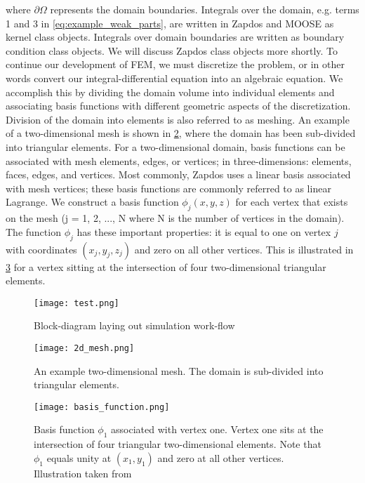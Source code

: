 where $\partial\Omega$ represents the domain boundaries. Integrals over the domain, e.g. terms 1 and 3 in \cref{eq:example_weak_parts}, are written in Zapdos and MOOSE as kernel class objects. Integrals over domain boundaries are written as boundary condition class objects. We will discuss Zapdos class objects more shortly. To continue our development of FEM, we must discretize the problem, or in other words convert our integral-differential equation into an algebraic equation. We accomplish this by dividing the domain volume into individual elements and associating basis functions with different geometric aspects of the discretization. Division of the domain into elements is also referred to as meshing. An example of a two-dimensional mesh is shown in \cref{fig:mesh}, where the domain has been sub-divided into triangular elements. For a two-dimensional domain, basis functions can be associated with mesh elements, edges, or vertices; in three-dimensions: elements, faces, edges, and vertices. Most commonly, Zapdos uses a linear basis associated with mesh vertices; these basis functions are commonly referred to as linear Lagrange. We construct a basis function $\phi_j(x,y,z)$ for each vertex that exists on the mesh (j = 1, 2, ..., N where N is the number of vertices in the domain). The function $\phi_j$ has these important properties: it is equal to one on vertex $j$ with coordinates $(x_j,y_j,z_j)$ and zero on all other vertices. This is illustrated in \cref{fig:basis_function} for a vertex sitting at the intersection of four two-dimensional triangular elements.

\begin{figure}[htbp]
  \centering
  \texttt{[image: test.png]}
  \caption{Block-diagram laying out simulation work-flow}
  \label{fig:diagram_workflow}
\end{figure}

\begin{figure}[htbp]
  \centering
  \texttt{[image: 2d\_mesh.png]}
  \caption{An example two-dimensional mesh. The domain is sub-divided into triangular elements.}
  \label{fig:mesh}
\end{figure}

\begin{figure}[htbp]
  \centering
  \texttt{[image: basis\_function.png]}
  \caption{Basis function $\phi_1$ associated with vertex one. Vertex one sits at the intersection of four triangular two-dimensional elements. Note that $\phi_1$ equals unity at $(x_1,y_1)$ and zero at all other vertices. Illustration taken from \cite{FlahertyFEA}}
  \label{fig:basis_function}
\end{figure}


